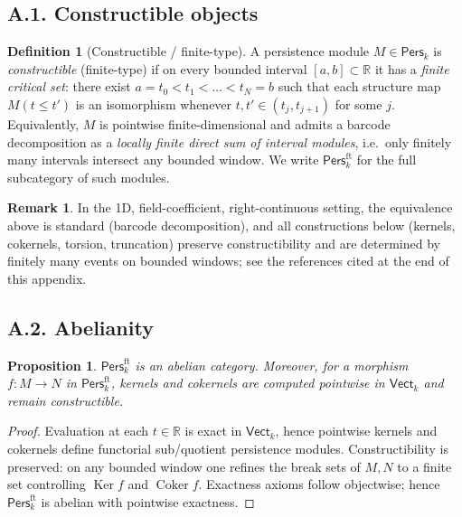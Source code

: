 \documentclass[11pt]{article}
\DeclareMathOperator{\Ker}{Ker}
\DeclareMathOperator{\Coker}{Coker}
\newcommand{\Pers}{\mathsf{Pers}}
\numberwithin{equation}{section}
\newtheorem{proposition}[theorem]{Proposition}
\theoremstyle{definition}
\newtheorem{definition}[theorem]{Definition}
\newtheorem{remark}[theorem]{Remark}
\begin{document}
\subsection*{A.1. Constructible objects}
\begin{definition}[Constructible / finite-type]\label{A:def:constructible}
A persistence module \(M\in\Pers_k\) is \emph{constructible} (finite-type) if on every bounded interval
\([a,b]\subset\mathbb{R}\) it has a \emph{finite critical set}: there exist
\(a=t_0<t_1<\dots<t_N=b\) such that each structure map
\(M(t\le t')\) is an isomorphism whenever \(t,t'\in (t_j,t_{j+1})\) for some \(j\).
Equivalently, \(M\) is pointwise finite-dimensional and admits a barcode decomposition as a
\emph{locally finite direct sum of interval modules}, i.e.\ only finitely many intervals intersect any bounded window.
We write \(\Pers^{\mathrm{ft}}_k\) for the full subcategory of such modules.
\end{definition}

\begin{remark}
In the 1D, field-coefficient, right-continuous setting, the equivalence above is standard (barcode decomposition), and all constructions below (kernels, cokernels, torsion, truncation) preserve constructibility and are determined by finitely many events on bounded windows; see the references cited at the end of this appendix.
\end{remark}

\subsection*{A.2. Abelianity}
\begin{proposition}\label{A:prop:abelian}
\(\Pers^{\mathrm{ft}}_k\) is an abelian category.
Moreover, for a morphism \(f:M\to N\) in \(\Pers^{\mathrm{ft}}_k\),
kernels and cokernels are computed pointwise in \(\mathsf{Vect}_k\) and remain constructible.
\end{proposition}

\begin{proof}
Evaluation at each \(t\in\mathbb{R}\) is exact in \(\mathsf{Vect}_k\), hence pointwise kernels and cokernels define functorial sub/quotient persistence modules.
Constructibility is preserved: on any bounded window one refines the break sets of \(M,N\) to a finite set controlling \(\Ker f\) and \(\Coker f\).
Exactness axioms follow objectwise; hence \(\Pers^{\mathrm{ft}}_k\) is abelian with pointwise exactness.
\end{proof}
\end{document}
